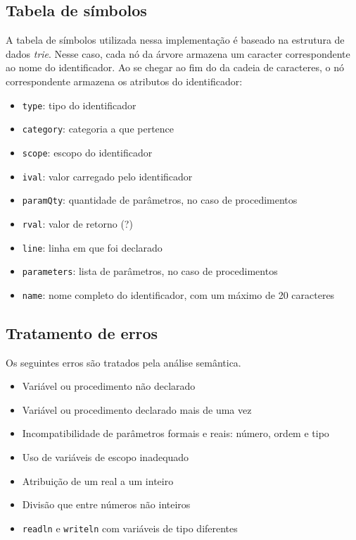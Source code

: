 \documentclass{article}
\begin{document}
	\subsection{Tabela de símbolos} %
	\label{sub:tabela_de_simbolos}
		A tabela de símbolos utilizada nessa implementação é baseado na estrutura de dados \emph{trie}. Nesse caso, cada nó da árvore armazena um caracter correspondente ao nome do identificador. Ao se chegar ao fim do da cadeia de caracteres, o nó correspondente armazena os atributos do identificador:

		\begin{itemize}
			\item \verb=type=: tipo do identificador
			\item \verb=category=: categoria a que pertence
			\item \verb=scope=: escopo do identificador
			\item \verb=ival=: valor carregado pelo identificador
			\item \verb=paramQty=: quantidade de parâmetros, no caso de procedimentos
			\item \verb=rval=: valor de retorno (?)
			\item \verb=line=: linha em que foi declarado
			\item \verb=parameters=: lista de parâmetros, no caso de procedimentos
			\item \verb=name=: nome completo do identificador, com um máximo de 20 caracteres
		\end{itemize}

	\subsection{Tratamento de erros} %
	\label{ssub:tratamento_de_erros}
		Os seguintes erros são tratados pela análise semântica.

		\begin{itemize}
			\item Variável ou procedimento não declarado
			\item Variável ou procedimento declarado mais de uma vez
			\item Incompatibilidade de parâmetros formais e reais: número, ordem e tipo
			\item Uso de variáveis de escopo inadequado
			\item Atribuição de um real a um inteiro
			\item Divisão que entre números não inteiros
			\item \verb=readln= e \verb=writeln= com variáveis de tipo diferentes
		\end{itemize}
	
\end{document}
